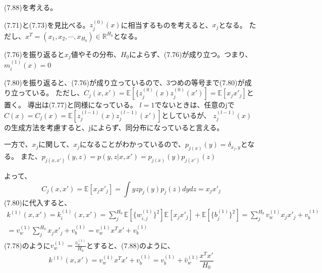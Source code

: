 \documentclass{jsarticle}
\begin{document}
(7.88)を考える。

(7.71)と(7.73)を見比べる。$z_j^{(0)}(x)$に相当するものを考えると、$x_j$となる。
ただし、$x^T = (x_1, x_2, \cdots, x_{H_0}) \in \mathbb{R}^{H_0}$となる。

(7.76)を振り返ると$x_j$値やその分布、$H_0$によらず、(7.76)が成り立つ。つまり、$m_i^{(1)}(x) = 0$

(7.80)を振り返ると、(7.76)が成り立っているので、3つめの等号まで(7.80)が成り立っている。
ただし、$C_j(x, x') = \mathbb{E}[\{ z_j^{(0)}(x) z_j^{(0)}(x')] = \mathbb{E}[ x_j x'_j ]$と置く。
導出は(7.77)と同様になっている。
$l = 1$でないときは、任意のjで$C(x) = C_j(x) = \mathbb{E}[ z_j^{(l -1)}(x) z_j^{(l -1)}(x')]$としているが、
$z_j^{(l-1)}(x)$の生成方法を考慮すると、jによらず、同分布になっていると言える。

一方で、$x_j$に関して、$x_j$になることがわかっているので、$p_{j(x)}(y) = \delta_{x_j, y}$となる。
また、$p_{j(x, x')}(y,z) = p(y, z | x, x') = p_{j(x)}(y)p_{j(x')}(z)$

よって、
\begin{equation}
C_j(x, x') = \mathbb{E}[ x_j x'_j] = \int yz p_j(y)p_j(z) dydz = x_j x'_j
\end{equation}
(7.80)に代入すると、
\begin{equation}
\begin{split}
k^{(1)}(x, x') = k_i^{(1)}(x, x') = \sum_j^{H_0} \mathbb{E}[\{ w_{i, j}^{(1)}\}^2]\mathbb{E}[x_j x'_j] + \mathbb{E}[\{ b_j^{(1)}\}^2]
= \sum_j^{H_0} v_w^{(1)} x_j x'_j + v_b^{(1)}\\
= v_w^{(1)} \sum_j^{H_0} x_j x'_j + v_b^{(1)}
= v_w^{(1)} x^T x' + v_b^{(1)}
\end{split}
\end{equation}
(7.78)のように$v_w^{(1)} = \frac{\hat{v}_w^{(1)}}{H_0}$とすると、(7.88)のように、
\begin{equation}
k^{(1)}(x, x') = v_w^{(1)} x^T x' + v_b^{(1)}
= v_b^{(1)} + \hat{v}_w^{(1)} \frac{x^T x'}{H_0}
\end{equation}
\end{document}
